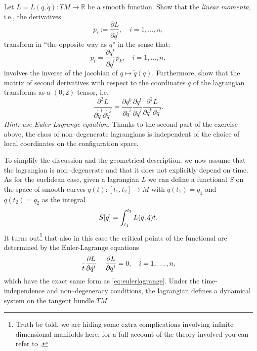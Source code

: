 \documentclass[english,fontsize=11pt,paper=a5,oneside]{scrbook}
\newcommand{\R}{\mathbb{R}}
\let\d\relax
\newcommand{\d}{\mathrm{d}}
\theoremstyle{definition}
\newenvironment{exercise}
  {\pushQED{\qed}\renewcommand{\qedsymbol}{$\maltese$}\exercisex}
  {\popQED\endexercisex}
\begin{document}
\begin{exercise}\label{exe:coordinatesInd}
  Let $L=L(q,\dot q):TM \to \R$ be a smooth function. Show that the \emph{linear momenta}, i.e., the derivatives
  \begin{equation}
    p_i := \frac{\partial L}{\partial \dot q^i}, \quad i=1,\ldots,n,
  \end{equation}
  transform in ``the opposite way as $\dot q$'' in the sense that:
  \begin{equation}
    \widetilde p_i = \frac{\partial q^k}{\partial {\widetilde q}^i} p_k, \quad i=1,\ldots,n,
  \end{equation}
  involves the inverse of the jacobian of $q\mapsto \widetilde q(q)$.
  Furthermore, show that the matrix of second derivatives with respect to the coordinates $\dot q$ of the lagrangian transforms as a $(0,2)$-tensor, i.e.
  \begin{equation}
    \frac{\partial^2 L}{\partial \dot{\widetilde q}^i \partial \dot{\widetilde q}^j} =
    \frac{\partial q^k}{\partial {\widetilde q}^i}\frac{\partial q^l}{\partial {\widetilde q}^j}
    \frac{\partial^2 L}{\partial \dot{q}^k \partial \dot{q}^l}.
  \end{equation}
  \textit{Hint: use Euler-Lagrange equation.}
\end{exercise}
Thanks to the second part of the exercise above, the class of non--degenerate lagrangians is independent of the choice of local coordinates on the configuration space.

To simplify the discussion and the geometrical description, we now assume that the lagrangian is non--degenerate and that it does not explicitly depend on time.
As for the euclidean case, given a lagrangian $L$ we can define a functional $S$ on the space of smooth curves $q(t): [t_1,t_2] \to M$ with $q(t_1) = q_1$ and $q(t_2) = q_2$ as the integral
\begin{equation}
  S[q] = \int_{t_1}^{t_2} L(q,\dot q) \d t.
\end{equation}
It turns out\footnote{Truth be told, we are hiding some extra complications involving infinite dimensional manifolds here, for a full account of the theory involved you can refer to \cite[Chapters 7 and 8]{book:marsdenratiu}.} that also in this case the critical points of the functional are determined by the Euler-Lagrange equations
\begin{equation}
  \frac{\d}{\d t}\frac{\partial L}{\partial \dot q^i} - \frac{\partial L}{\partial q^i} =0, \quad i=1,\ldots,n,
\end{equation}
which have the exact same form as \eqref{eq:eulerlagrange}.
Under the time-independence and non--degeneracy conditions, the lagrangian defines a dynamical system on the tangent bundle $TM$.
\end{document}
